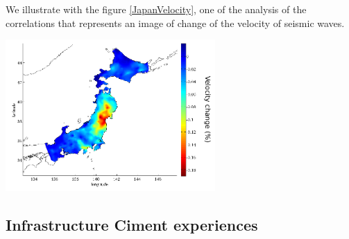 \documentclass[a4paper, 10pt]{article}
\begin{document}
\begin{multicols}{2}
We illustrate with the figure \ref{JapanVelocity}, one of the analysis of the correlations that represents an image
of change of the velocity of seismic waves.
\begin{center}%
\centering
{}
\includegraphics[width=8cm]{JapanVelocity.png}
\end{center}


\subsection{Infrastructure Ciment experiences}


\end{multicols}
\end{document}
